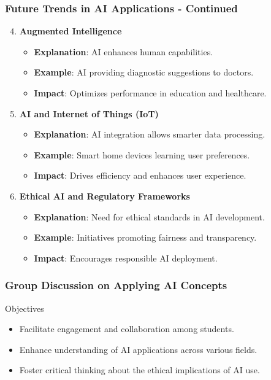 \documentclass[aspectratio=169]{beamer}
\begin{document}
\begin{frame}[fragile]
    \frametitle{Future Trends in AI Applications - Continued}
    \begin{enumerate} \setcounter{enumi}{3}
        \item \textbf{Augmented Intelligence}
            \begin{itemize}
                \item \textbf{Explanation}: AI enhances human capabilities.
                \item \textbf{Example}: AI providing diagnostic suggestions to doctors.
                \item \textbf{Impact}: Optimizes performance in education and healthcare.
            \end{itemize}

        \item \textbf{AI and Internet of Things (IoT)}
            \begin{itemize}
                \item \textbf{Explanation}: AI integration allows smarter data processing.
                \item \textbf{Example}: Smart home devices learning user preferences.
                \item \textbf{Impact}: Drives efficiency and enhances user experience.
            \end{itemize}

        \item \textbf{Ethical AI and Regulatory Frameworks}
            \begin{itemize}
                \item \textbf{Explanation}: Need for ethical standards in AI development.
                \item \textbf{Example}: Initiatives promoting fairness and transparency.
                \item \textbf{Impact}: Encourages responsible AI deployment.
            \end{itemize}
    \end{enumerate}
\end{frame}

\begin{frame}[fragile]
    \frametitle{Group Discussion on Applying AI Concepts}
    \begin{block}{Objectives}
        \begin{itemize}
            \item Facilitate engagement and collaboration among students.
            \item Enhance understanding of AI applications across various fields.
            \item Foster critical thinking about the ethical implications of AI use.
        \end{itemize}
    \end{block}
\end{frame}
\end{document}
